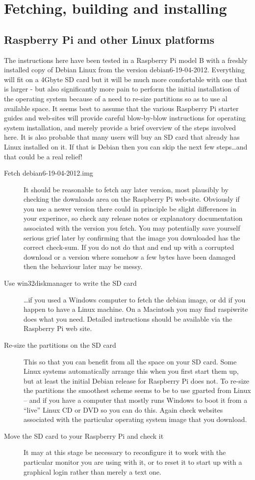 \chapter{Fetching, building and installing \vsl}
\section{Raspberry Pi and other Linux platforms}
The instructions here have been tested in a Raspberry Pi model B
with a freshly installed copy of Debian Linux from the version
{\tx debian6-19-04-2012}. Everything will fit on a 4Gbyte SD card but
it will be much more comfortable with one that is larger - but also
significantly more pain to perform the initial installation of the
operating system because of a need to re-size partitions so as to use
al available space. It seems best to assume that the various Raspberry Pi
starter guides and web-sites will provide careful blow-by-blow instructions
for operating system installation, and merely provide a brief overview
of the steps involved here. It is also probable that many users will
buy an SD card that already has Linux installed on it. If that is Debian
then you can skip the next few steps\ldots and that could be a real
relief!

\begin{description}
\item[Fetch {\tx debian6-19-04-2012.img}] It should be reasonable to fetch
any later version, most plausibly by checking the downloads area on the
Raspberry Pi web-site. Obviously if you use a newer version there could
in principle be slight differences in your experince, so check any
release notes or explanatory documentation associated with the version
you fetch. You may potentially save yourself serious grief later by
confirming that the image you downloaded has the correct check-sum. If you
do not  do that and end up with a corrupted download or a version where
somehow a few bytes have been damaged then the behaviour later may be
messy.
\item[Use {\tx win32diskmanager} to write the SD card] \ldots if you
used a Windows computer to fetch the debian image, or {\tx dd} if you happen
to have a Linux machine. On a Macintosh you may find
{\tx raspiwrite} does what you need. Detailed instructions should be
available via the Raspberry Pi web site.
\item[Re-size the partitions on the SD card] This so that you can benefit from
all the space on your SD card. Some Linux systems automatically arrange this
when you first start them up, but at least the initial Debian release for
Raspberry Pi does not. To re-size the partitions the smoothest scheme seems
to be to use {\tx gparted} from Linux -- and if you have a computer that
mostly runs Windows to boot it from a ``live'' Linux CD or DVD so you
can do this. Again check websites associated with the particular
operating system image that you download.
\item[Move the SD card to your Raspberry Pi and check it] It may at this
stage be necessary to reconfigure it to work with the particular monitor
you are using with it, or to reset it to start up with a graphical login
rather than merely a text one. 
\end{description}

